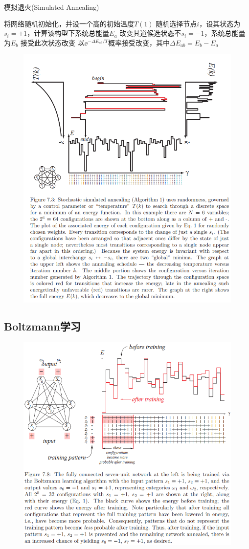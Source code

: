 \begin{algorithm}[H]
\caption{模拟退火(Simulated Annealing)}
\begin{algorithmic}[2]
\State 将网络随机初始化，并设一个高的初始温度$T(1)$
\State 随机选择节点$i$，设其状态为$s_i=+1$，计算该构型下系统总能量$E_a$
\State 改变其道候选状态不$s_i=-1$，系统总能量为$E_b$
\State 接受此次状态改变
\Else
\State 以$\ee^{-\Delta E_{ab}/T}$概率接受改变，其中$\Delta E_{ab}=E_b-E_a$
\EndIf
\end{algorithmic}
\end{algorithm}
\begin{figure}[H]
\centering
\includegraphics[width=0.8\linewidth]{fig/simulated_annealing.png}
\end{figure}

\subsection{Boltzmann学习}
\begin{figure}[H]
\centering
\includegraphics[width=0.8\linewidth]{fig/boltzmann_learning.png}
\end{figure}